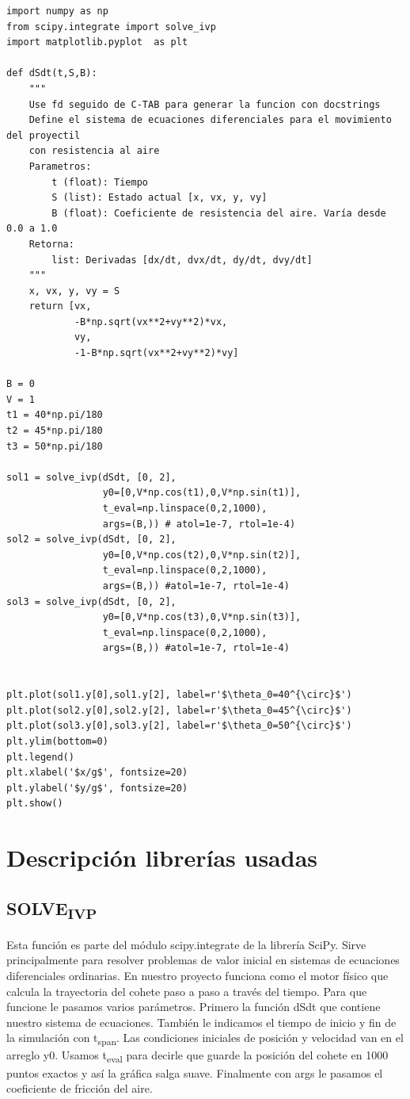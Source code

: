 \documentclass{article}
\begin{document}
\begin{verbatim}
import numpy as np
from scipy.integrate import solve_ivp
import matplotlib.pyplot  as plt

def dSdt(t,S,B):
    """
    Use fd seguido de C-TAB para generar la funcion con docstrings
    Define el sistema de ecuaciones diferenciales para el movimiento del proyectil
    con resistencia al aire
    Parametros:
        t (float): Tiempo
        S (list): Estado actual [x, vx, y, vy]
        B (float): Coeficiente de resistencia del aire. Varía desde 0.0 a 1.0
    Retorna:
        list: Derivadas [dx/dt, dvx/dt, dy/dt, dvy/dt]
    """
    x, vx, y, vy = S
    return [vx,
            -B*np.sqrt(vx**2+vy**2)*vx,
            vy,
            -1-B*np.sqrt(vx**2+vy**2)*vy]

B = 0
V = 1
t1 = 40*np.pi/180
t2 = 45*np.pi/180
t3 = 50*np.pi/180

sol1 = solve_ivp(dSdt, [0, 2],
                 y0=[0,V*np.cos(t1),0,V*np.sin(t1)],
                 t_eval=np.linspace(0,2,1000),
                 args=(B,)) # atol=1e-7, rtol=1e-4)
sol2 = solve_ivp(dSdt, [0, 2],
                 y0=[0,V*np.cos(t2),0,V*np.sin(t2)],
                 t_eval=np.linspace(0,2,1000),
                 args=(B,)) #atol=1e-7, rtol=1e-4)
sol3 = solve_ivp(dSdt, [0, 2],
                 y0=[0,V*np.cos(t3),0,V*np.sin(t3)],
                 t_eval=np.linspace(0,2,1000),
                 args=(B,)) #atol=1e-7, rtol=1e-4)


plt.plot(sol1.y[0],sol1.y[2], label=r'$\theta_0=40^{\circ}$')
plt.plot(sol2.y[0],sol2.y[2], label=r'$\theta_0=45^{\circ}$')
plt.plot(sol3.y[0],sol3.y[2], label=r'$\theta_0=50^{\circ}$')
plt.ylim(bottom=0)
plt.legend()
plt.xlabel('$x/g$', fontsize=20)
plt.ylabel('$y/g$', fontsize=20)
plt.show()

\end{verbatim}

\section{Descripción librerías usadas}
\label{sec:org9c7a1ba}

\subsection{SOLVE\textsubscript{IVP}}
\label{sec:orgcc10af8}
Esta función es parte del módulo scipy.integrate de la librería
 SciPy. Sirve principalmente para resolver problemas de valor inicial
 en sistemas de ecuaciones diferenciales ordinarias.
 En nuestro proyecto funciona como el motor físico que calcula la
 trayectoria del cohete paso a paso a través del tiempo.
 Para que funcione le pasamos varios parámetros. Primero la función
 dSdt que contiene nuestro sistema de ecuaciones. También le indicamos
 el tiempo de inicio y fin de la simulación con t\textsubscript{span}.
 Las condiciones iniciales de posición y velocidad van en el arreglo
 y0. Usamos t\textsubscript{eval} para decirle que guarde la posición del cohete en
 1000 puntos exactos y así la gráfica salga suave.
 Finalmente con args le pasamos el coeficiente de fricción del aire.
\end{document}
